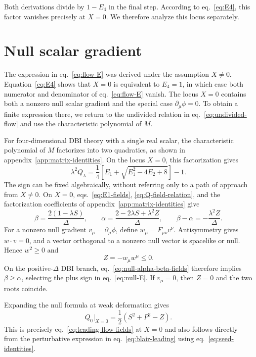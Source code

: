 \documentclass[a4paper,11pt]{article}
\numberwithin{equation}{section}
\begin{document}
Both derivations divide by $1-E_4$ in the final step. According to eq.~\eqref{eq:E4}, this factor vanishes precisely at $X=0$. We therefore analyze this locus separately.

\section{Null scalar gradient}
\label{sec:null}

The expression in eq.~\eqref{eq:flow-E} was derived under the assumption $X\neq0$. Equation~\eqref{eq:E4} shows that $X=0$ is equivalent to $E_4=1$, in which case both numerator and denominator of eq.~\eqref{eq:flow-E} vanish. The locus $X=0$ contains both a nonzero null scalar gradient and the special case $\partial_\mu\phi=0$. To obtain a finite expression there, we return to the undivided relation in eq.~\eqref{eq:undivided-flow} and use the characteristic polynomial of $M$.

For four-dimensional DBI theory with a single real scalar, the characteristic polynomial of $M$ factorizes into two quadratics, as shown in appendix~\ref{app:matrix-identities}. On the locus $X=0$, this factorization gives
\begin{equation}
 \lambda^2Q_\lambda
 =\frac14\left[E_1+\sqrt{E_1^2-4E_2+8}\right]-1.
 \label{eq:null-E}
\end{equation}
The sign can be fixed algebraically, without referring only to a path of approach from $X\neq0$. On $X=0$, eqs.~\eqref{eq:E1-fields}, \eqref{eq:Q-field-relation}, and the factorization coefficients of appendix~\ref{app:matrix-identities} give
\begin{equation}
 \beta=\frac{2(1-\lambda S)}{\Delta},
 \qquad
 \alpha=\frac{2-2\lambda S+\lambda^2Z}{\Delta},
 \qquad
 \beta-\alpha=-\frac{\lambda^2Z}{\Delta}.
 \label{eq:null-alpha-beta-fields}
\end{equation}
For a nonzero null gradient $v_\mu=\partial_\mu\phi$, define $w_\mu=F_{\mu\nu}v^\nu$. Antisymmetry gives $w\cdot v=0$, and a vector orthogonal to a nonzero null vector is spacelike or null. Hence $w^2\geq0$ and
\begin{equation}
 Z=-w_\mu w^\mu\leq0.
 \label{eq:null-Z-sign}
\end{equation}
On the positive-$\Delta$ DBI branch, eq.~\eqref{eq:null-alpha-beta-fields} therefore implies $\beta\geq\alpha$, selecting the plus sign in eq.~\eqref{eq:null-E}. If $v_\mu=0$, then $Z=0$ and the two roots coincide.

Expanding the null formula at weak deformation gives
\begin{equation}
 Q_0\big|_{X=0}=\frac12\left(S^2+P^2-Z\right).
 \label{eq:null-weak-limit}
\end{equation}
This is precisely eq.~\eqref{eq:leading-flow-fields} at $X=0$ and also follows directly from the perturbative expression in eq.~\eqref{eq:blair-leading} using eq.~\eqref{eq:seed-identities}.
\end{document}
